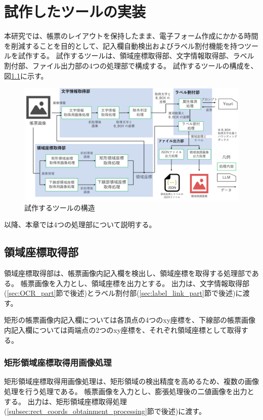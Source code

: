 \chapter{試作したツールの実装}\label{cha:Implementation}
本研究では、帳票のレイアウトを保持したまま、電子フォーム作成にかかる時間を削減することを目的として、記入欄自動検出およびラベル割付機能を持つツールを試作する。
試作するツールは、領域座標取得部、文字情報取得部、ラベル割付部、ファイル出力部の4つの処理部で構成する。
試作するツールの構成を、図\ref{fig:structure}に示す。

\begin{figure}[tp]
    \begin{center}
        \includegraphics[width=15cm]{image/04-implementation/structure.png}
        \caption{試作するツールの構造}
        \label{fig:structure}
    \end{center}
\end{figure}

以降、本章では4つの処理部について説明する。


\section{領域座標取得部}\label{sec:area_coords_obtainment_part}
領域座標取得部は、帳票画像内記入欄を検出し、領域座標を取得する処理部である。
帳票画像を入力とし、領域座標を出力とする。
出力は、文字情報取得部(\ref{sec:OCR_part}節で後述)とラベル割付部(\ref{sec:label_link_part}節で後述)に渡す。

矩形の帳票画像内記入欄については各頂点の4つのxy座標を、下線部の帳票画像内記入欄については両端点の2つのxy座標を、それぞれ領域座標として取得する。

\subsection{矩形領域座標取得用画像処理}\label{subsec:image_processing_for_rect_coords_obtainment}
矩形領域座標取得用画像処理は、矩形領域の検出精度を高めるため、複数の画像処理を行う処理である。
帳票画像を入力とし、膨張処理後の二値画像を出力とする。
出力は、矩形領域座標取得処理(\ref{subsec:rect_coords_obtainment_processing}節で後述)に渡す。

